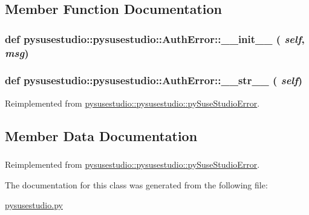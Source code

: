 \subsection{Member Function Documentation}
\hypertarget{classpysusestudio_1_1pysusestudio_1_1_auth_error_a8c6866fece204307992fe5ae3fc31326}{
\subsubsection[{\_\-\_\-init\_\-\_\-}]{\setlength{\rightskip}{0pt plus 5cm}def pysusestudio::pysusestudio::AuthError::\_\-\_\-init\_\-\_\- ( {\em self}, \/   {\em msg})}}
\label{classpysusestudio_1_1pysusestudio_1_1_auth_error_a8c6866fece204307992fe5ae3fc31326}
\hypertarget{classpysusestudio_1_1pysusestudio_1_1_auth_error_ae39d2b39c5c736257a3352b13002c54a}{
\subsubsection[{\_\-\_\-str\_\-\_\-}]{\setlength{\rightskip}{0pt plus 5cm}def pysusestudio::pysusestudio::AuthError::\_\-\_\-str\_\-\_\- ( {\em self})}}
\label{classpysusestudio_1_1pysusestudio_1_1_auth_error_ae39d2b39c5c736257a3352b13002c54a}


Reimplemented from \hyperlink{classpysusestudio_1_1pysusestudio_1_1py_suse_studio_error_a117b0e3520484fdd941246f2a1bf9345}{pysusestudio::pysusestudio::pySuseStudioError}.

\subsection{Member Data Documentation}
\hypertarget{classpysusestudio_1_1pysusestudio_1_1_auth_error_a530b3891fcdb5847996cc733eb0ecf28}{
\subsubsection[{msg}]{}}
\label{classpysusestudio_1_1pysusestudio_1_1_auth_error_a530b3891fcdb5847996cc733eb0ecf28}


Reimplemented from \hyperlink{classpysusestudio_1_1pysusestudio_1_1py_suse_studio_error_ad793aaac43eed7419fc64adfba1d2b0f}{pysusestudio::pysusestudio::pySuseStudioError}.

The documentation for this class was generated from the following file:\begin{DoxyCompactItemize}
\item 
\hyperlink{pysusestudio_8py}{pysusestudio.py}\end{DoxyCompactItemize}
